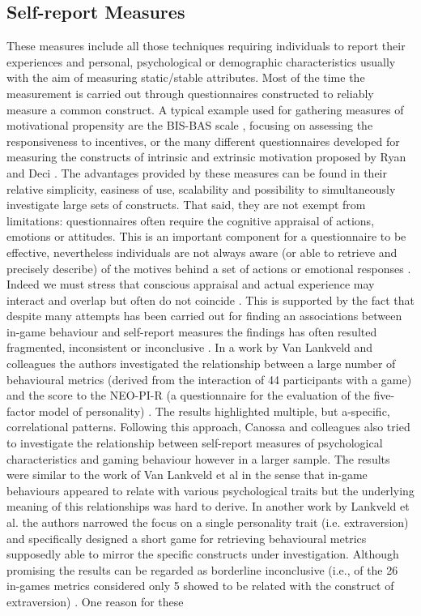 \subsection{Self-report Measures}
\label{self_report}
These measures include all those techniques requiring individuals to report their experiences and personal, psychological or demographic characteristics usually with the aim of measuring static/stable attributes. Most of the time the measurement is carried out through questionnaires constructed to reliably measure a common construct. A typical example used for gathering measures of motivational propensity are the BIS-BAS scale \cite{carver1994behavioral}, focusing on assessing the responsiveness to incentives, or the many different questionnaires developed for measuring the constructs of intrinsic and extrinsic motivation proposed by Ryan and Deci \cite{ryan2000self}. The advantages provided by these measures can be found in their relative simplicity, easiness of use, scalability and possibility to simultaneously investigate large sets of constructs. That said, they are not exempt from limitations: questionnaires often require the cognitive appraisal of actions, emotions or attitudes. This is an important component for a questionnaire to be effective, nevertheless individuals are not always aware (or able to retrieve and precisely describe) of the motives behind a set of actions or emotional responses \cite{avserivskis2017computational}. Indeed we must stress that conscious appraisal and actual experience may interact and overlap but often do not coincide \cite{poeller2018let}. This is supported by the fact that despite many attempts has been carried out for finding an associations between in-game behaviour and self-report measures the findings has often resulted fragmented, inconsistent or inconclusive \cite{canossa2013give, stankevicius2015factor, schaekermann2017curiously}. In a work by Van Lankveld and colleagues \cite{van2009psychologically} the authors investigated the relationship between a large number of behavioural metrics (derived from the interaction of 44 participants with a game) and the score to the NEO-PI-R (a questionnaire for the evaluation of the five-factor model of personality) \cite{costa2008revised}. The results highlighted multiple, but a-specific, correlational patterns. Following this approach, Canossa and colleagues \cite{canossa2013give} also tried to investigate the relationship between self-report measures of psychological characteristics and gaming behaviour however in a larger sample. The results were similar to the work of Van Lankveld et al in the sense that in-game behaviours appeared to relate with various psychological traits but the underlying meaning of this relationships was hard to derive. In another work by Lankveld et al. the authors narrowed the focus on a single personality trait (i.e. extraversion)  and specifically designed a short game for retrieving behavioural metrics supposedly able to mirror the specific constructs under investigation. Although promising the results can be regarded as borderline inconclusive (i.e., of the 26 in-games metrics considered only 5 showed to be related with the construct of extraversion) \cite{van2011games}. One reason for these 